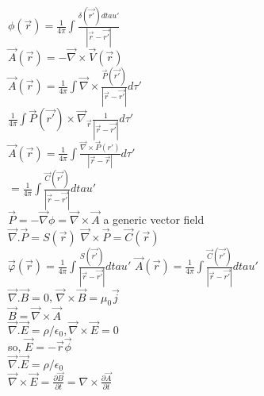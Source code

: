 \documentclass{report}
\begin{document}
$\phi(\vec{r})=\frac{1}{4\pi}\int\frac{\delta(\vec{r'})d tau'}{|\vec{r}-\vec{r'}|}$\\

$\vec{A}(\vec{r})=-\vec{\nabla}\times\vec{V}(\vec{r})$\\

$\vec{A}(\vec{r})=\frac{1}{4\pi}\int\vec{\nabla}\times\frac{\vec{P}(\vec{r'})}{|\vec{r}-\vec{r'}|}d \tau'$\\

\hspace{5mm} $\frac{1}{4\pi}\int \vec{P}(\vec{r'})\times \vec{\nabla}_{\vec{r}}\frac{1}{|\vec{r}-\vec{r'}|}d \tau'$\\

$\vec{A}(\vec{r})=\frac{1}{4\pi}\int\frac{\vec{\nabla}\times
\vec{P}(r')}{|\vec{r}-\vec{r}|}d \tau'$\\

$=\frac{1}{4\pi}\int\frac{\vec{C}(\vec{r'})}{|\vec{r}-\vec{r'}|}d tau'$\\

$\vec{P}=-\vec{\nabla}\phi=\vec{\nabla}\times\vec{A}$ \hspace{5mm} a generic vector field\\

$\vec{\nabla}.\vec{P}=S(\vec{r})$ \hspace{5mm} $\vec{\nabla}\times\vec{P}=\vec{C}(\vec{r})$\\

$\vec{\varphi}(\vec{r})=\frac{1}{4\pi}\int\frac{S(\vec{r'})}{|\vec{r}-\vec{r'}|}d tau'$ \hspace{5mm}  $\vec{A}(\vec{r})=\frac{1}{4\pi}\int \frac{\vec{C}(\vec{r'})}{|\vec{r}-\vec{r'}|}d tau'$\\

$\vec{\nabla}.\vec{B}=0$, $\vec{\nabla}\times \vec{B}=\mu_{0}\vec{j}$\\

$\vec{B}=\vec{\nabla}\times \vec{A}$\\

$\vec{\nabla}.\vec{E}=\rho/\epsilon_{0}, \vec{\nabla}\times\vec{E}=0$\\

so, $\vec{E}=-\vec{r}\vec{\phi}$\\

$\vec{\nabla}.\vec{E}=\rho/\epsilon_{0}$\\

$\vec{\nabla}\times\vec{E}=\frac{\partial \vec{B}}{\partial t}=\nabla\times \frac{\partial \vec{A}}{\partial t}$\\
\end{document}
